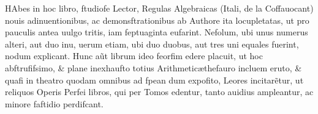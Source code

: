 \lettrine[lines=2,nindent=0pt,findent=1pt]{H}{A}bes in hoc libro, ftudiofe Lector, Regulas Algebraicas (Itali, de la Coffauocant) nouis adinuentionibus, ac demonsftrationibus ab Authore ita locupletatas, ut pro pauculis antea uulgo tritis, iam feptuaginta eufarint. Nefolum, ubi unus numerus alteri, aut duo inu, uerum etiam, ubi duo duobus, aut tres uni equales fuerint, nodum explicant. Hunc a\~{u}t librum ideo feorfim edere placuit, ut hoc abftrufifsimo, \& plane inexhaufto totius Arithmetic\ae thefauro incluem eruto, \& quafi in theatro quodam omnibus ad fpe{\ct}an dum expofito, Le{\ct}ores incitar\~{e}tur, ut reliquos Operis Perfe{\ct}i libros, qui per Tomos edentur, tanto auidius ample{\ct}antur, ac minore faftidio perdifcant.
